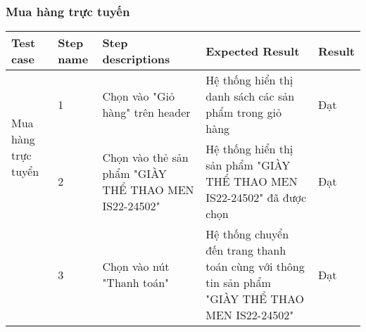\subsubsection{Mua hàng trực tuyến}
{
    \setlength\extrarowheight{6pt}
    \begin{longtable}{| p{2.5cm}| p{1cm}| p{5.5cm}| p{4.5cm} | p{1.5cm} |}
        \hline
        \textbf{Test case}                                                                              & \textbf{Step name} & \textbf{Step descriptions} & \textbf{Expected Result} & \textbf{Result} \\
        \hline
        \multirow[t]{2}{2.5cm}{Mua hàng trực tuyển}                                                     &
        1                                                                                               &
        Chọn vào "Giỏ hàng" trên header                                                                 &
        Hệ thống hiển thị danh sách các sản phẩm trong giỏ hàng                                         &
        Đạt                                                                                                                                                                                            \\
        \cline{2-5}
                                                                                                        & 2                  &
        Chọn vào thẻ sản phẩm "GIÀY THỂ THAO MEN IS22-24502"                                            &
        Hệ thống hiển thị sản phẩm "GIÀY THỂ THAO MEN IS22-24502" đã được chọn                          &
        Đạt                                                                                                                                                                                            \\
        \cline{2-5}
                                                                                                        & 3                  &
        Chọn vào nút "Thanh toán"                                                                       &
        Hệ thống chuyển đến trang thanh toán cùng với thông tin sản phẩm "GIÀY THỂ THAO MEN IS22-24502" &
        Đạt                                                                                                                                                                                            \\

\end{longtable}}
